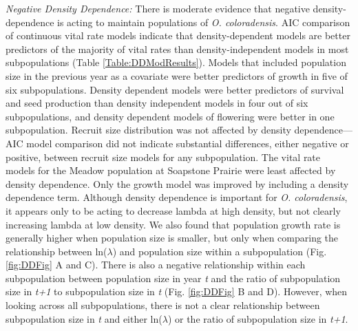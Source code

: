 \documentclass[12pt, letterpaper]{article}
\begin{document}
\textit{Negative Density Dependence:} There is moderate evidence that negative density-dependence is acting to maintain populations of \textit{O. coloradensis}. AIC comparison of continuous vital rate models indicate that density-dependent models are better predictors of the majority of vital rates than density-independent models in most subpopulations (Table \ref{Table:DDModResults}).  Models that included population size in the previous year as a covariate were better predictors of growth in five of six subpopulations. Density dependent models were better predictors of survival and seed production than density independent models in four out of six subpopulations, and density dependent models of flowering were better in one subpopulation. Recruit size distribution was not affected by density dependence—AIC model comparison did not indicate substantial differences, either negative or positive, between recruit size models for any subpopulation. The vital rate models for the Meadow population at Soapstone Prairie were least affected by density dependence. Only the growth model was improved by including a density dependence term. Although density dependence is important for \textit{O. coloradensis}, it appears only to be acting to decrease lambda at high density, but not clearly increasing lambda at low density. We also found that population growth rate is generally higher when population size is smaller, but only when comparing the relationship between ln($\lambda$) and population size within a subpopulation (Fig. \ref{fig:DDFig} A and C). There is also a negative relationship within each subpopulation between population size in year \textit{t} and the ratio of subpopulation size in \textit{t+1} to subpopulation size in \textit{t} (Fig. \ref{fig:DDFig} B and D). However, when looking across all subpopulations, there is not a clear relationship between subpopulation size in \textit{t} and either ln($\lambda$) or the ratio of subpopulation size in \textit{t+1}.  
\end{document}
